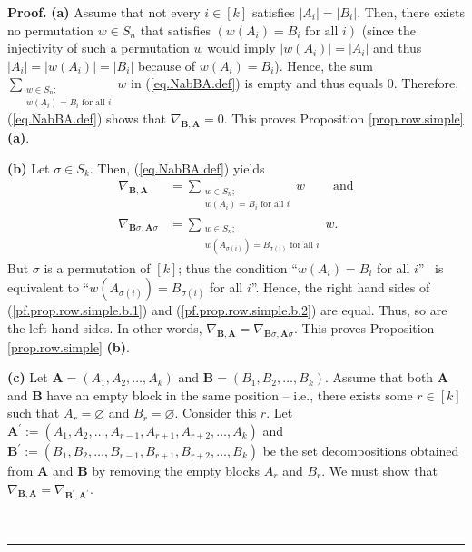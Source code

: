 \documentclass[numbers=enddot,12pt,final,onecolumn,notitlepage]{scrartcl}%
\numberwithin{exer}{subsection}
\theoremstyle{definition}
\newenvironment{proof}[1][Proof]{\noindent\textbf{#1.} }{\ \rule{0.5em}{0.5em}}
\let\sumnonlimits\sum
\renewcommand{\sum}{\sumnonlimits\limits}
\begin{document}
\begin{proof}
\textbf{(a)} Assume that not every $i\in\left[  k\right]  $ satisfies
$\left\vert A_{i}\right\vert =\left\vert B_{i}\right\vert $. Then, there
exists no permutation $w\in S_{n}$ that satisfies $\left(  w\left(
A_{i}\right)  =B_{i}\text{ for all }i\right)  $ (since the injectivity of such
a permutation $w$ would imply $\left\vert w\left(  A_{i}\right)  \right\vert
=\left\vert A_{i}\right\vert $ and thus $\left\vert A_{i}\right\vert
=\left\vert w\left(  A_{i}\right)  \right\vert =\left\vert B_{i}\right\vert $
because of $w\left(  A_{i}\right)  =B_{i}$). Hence, the sum $\sum
_{\substack{w\in S_{n};\\w\left(  A_{i}\right)  =B_{i}\text{ for all }i}}w$ in
(\ref{eq.NabBA.def}) is empty and thus equals $0$. Therefore,
(\ref{eq.NabBA.def}) shows that $\nabla_{\mathbf{B},\mathbf{A}}=0$. This
proves Proposition \ref{prop.row.simple} \textbf{(a)}. \medskip

\textbf{(b)} Let $\sigma\in S_{k}$. Then, (\ref{eq.NabBA.def}) yields
\begin{align}
\nabla_{\mathbf{B},\mathbf{A}}  &  =\sum_{\substack{w\in S_{n};\\w\left(
A_{i}\right)  =B_{i}\text{ for all }i}}w\ \ \ \ \ \ \ \ \ \ \text{and}%
\label{pf.prop.row.simple.b.1}\\
\nabla_{\mathbf{B}\sigma,\mathbf{A}\sigma}  &  =\sum_{\substack{w\in
S_{n};\\w\left(  A_{\sigma\left(  i\right)  }\right)  =B_{\sigma\left(
i\right)  }\text{ for all }i}}w. \label{pf.prop.row.simple.b.2}%
\end{align}
But $\sigma$ is a permutation of $\left[  k\right]  $; thus the condition
\textquotedblleft$w\left(  A_{i}\right)  =B_{i}$ for all $i$\textquotedblright%
\ is equivalent to \textquotedblleft$w\left(  A_{\sigma\left(  i\right)
}\right)  =B_{\sigma\left(  i\right)  }$ for all $i$\textquotedblright. Hence,
the right hand sides of (\ref{pf.prop.row.simple.b.1}) and
(\ref{pf.prop.row.simple.b.2}) are equal. Thus, so are the left hand sides. In
other words, $\nabla_{\mathbf{B},\mathbf{A}}=\nabla_{\mathbf{B}\sigma
,\mathbf{A}\sigma}$. This proves Proposition \ref{prop.row.simple}
\textbf{(b)}. \medskip

\textbf{(c)} Let $\mathbf{A}=\left(  A_{1},A_{2},\ldots,A_{k}\right)  $ and
$\mathbf{B}=\left(  B_{1},B_{2},\ldots,B_{k}\right)  $. Assume that both
$\mathbf{A}$ and $\mathbf{B}$ have an empty block in the same position --
i.e., there exists some $r\in\left[  k\right]  $ such that $A_{r}=\varnothing$
and $B_{r}=\varnothing$. Consider this $r$. Let $\mathbf{A}^{\prime}:=\left(
A_{1},A_{2},\ldots,A_{r-1},A_{r+1},A_{r+2},\ldots,A_{k}\right)  $ and
$\mathbf{B}^{\prime}:=\left(  B_{1},B_{2},\ldots,B_{r-1},B_{r+1}%
,B_{r+2},\ldots,B_{k}\right)  $ be the set decompositions obtained from
$\mathbf{A}$ and $\mathbf{B}$ by removing the empty blocks $A_{r}$ and $B_{r}%
$. We must show that $\nabla_{\mathbf{B},\mathbf{A}}=\nabla_{\mathbf{B}%
^{\prime},\mathbf{A}^{\prime}}$.


\end{proof}
\end{document}
